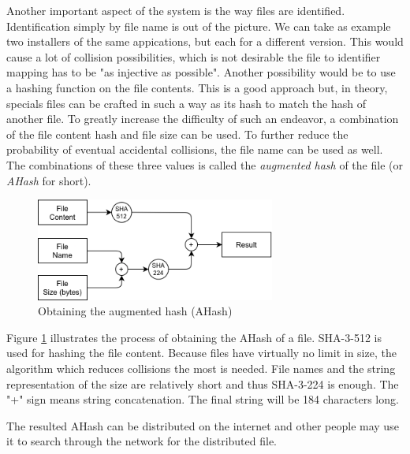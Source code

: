 Another important aspect of the system is the way files are identified. 
Identification simply by file name is out of the picture. We can take as 
example two installers of the same appications, but each for a different 
version. This would cause a lot of collision possibilities, which is not 
desirable the file to identifier mapping has to be "as injective as possible". 
Another possibility would be to use a hashing function on the file contents. 
This is a good approach but, in theory, specials files can be crafted in such a 
way as its hash to match the hash of another file. To greatly increase the 
difficulty of such an endeavor, a combination of the file content hash and file 
size can be used. To further reduce the probability of eventual accidental 
collisions, the file name can be used as well. The combinations of these three 
values is called the \textit{augmented hash} of the file (or \textit{AHash} for 
short).

\begin{figure}
    \centering
    \includegraphics[width=0.7\textwidth]{figures/fig3}
    \caption{Obtaining the augmented hash (AHash)}
    \label{fig:fig3}
\end{figure}

Figure \ref{fig:fig3} illustrates the process of obtaining the AHash of a file. 
SHA-3-512 is used for hashing the file content. Because files have virtually no 
limit in size, the algorithm which reduces collisions the most is needed. File 
names and the string representation of the size are relatively short and thus 
SHA-3-224 is enough. The "+" sign means string concatenation. The final string 
will be 184 characters long.

The resulted AHash can be distributed on the internet and other people may use 
it to search through the network for the distributed file.
